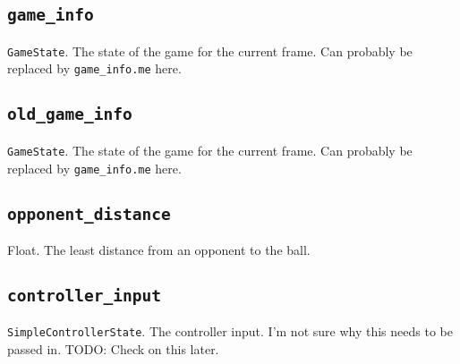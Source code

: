 \documentclass{article}
\newcommand{\argumenta}[1]{\subsection{\texttt{#1}}}
\begin{document}
\begin{flushleft}
{           \argumenta{game\_info}
                     {
                       \texttt{GameState}.  The state of the game for the current frame.  Can probably be replaced by \texttt{game\_info.me} here.
                     }
           \argumenta{old\_game\_info}
                     {
                       \texttt{GameState}.  The state of the game for the current frame.  Can probably be replaced by \texttt{game\_info.me} here.
                     }
           \argumenta{opponent\_distance}
                     {
                       Float.  The least distance from an opponent to the ball.
                     }
           \argumenta{controller\_input}
                     {
                       \texttt{SimpleControllerState}.  The controller input.  I'm not sure why this needs to be passed in.  TODO: Check on this later.
                     }
         }
































  
  





\end{flushleft}
\end{document}
